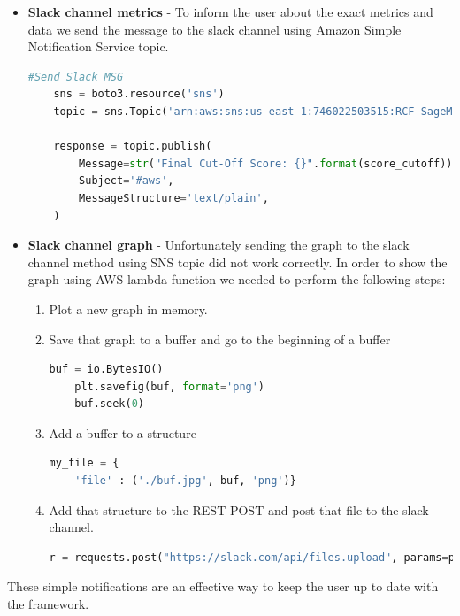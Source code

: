 \begin{itemize}
\item \textbf{Slack channel metrics} - To inform the user about the exact metrics and data we send the message to the slack channel using Amazon Simple Notification Service topic.

\begin{lstlisting}[language=Python, caption=Sending message to slack channel using SNS topic]
    #Send Slack MSG
    sns = boto3.resource('sns')
    topic = sns.Topic('arn:aws:sns:us-east-1:746022503515:RCF-SageMaker')
    
    response = topic.publish(
        Message=str("Final Cut-Off Score: {}".format(score_cutoff)),
        Subject='#aws',
        MessageStructure='text/plain',
    )
\end{lstlisting}
\item \textbf{Slack channel graph} - Unfortunately sending the graph to the slack channel method using SNS topic did not work correctly. In order to show the graph using AWS lambda function we needed to perform the following steps:

\begin{enumerate}
\item Plot a new graph in memory.
\item Save that graph to a buffer and go to the beginning of a buffer
\begin{lstlisting}[language=Python, numbers=none]
    buf = io.BytesIO()
    plt.savefig(buf, format='png')
    buf.seek(0)
\end{lstlisting}
\item Add a buffer to a structure
\begin{lstlisting}[language=Python, numbers=none]
    my_file = {
    'file' : ('./buf.jpg', buf, 'png')}
\end{lstlisting}

\item Add that structure to the REST POST and post that file to the slack channel.

\begin{lstlisting}[language=Python, numbers=none]
    r = requests.post("https://slack.com/api/files.upload", params=payload, files=my_file)
\end{lstlisting}

\end{enumerate}
\end{itemize}

These simple notifications are an effective way to keep the user up to date with the framework.


